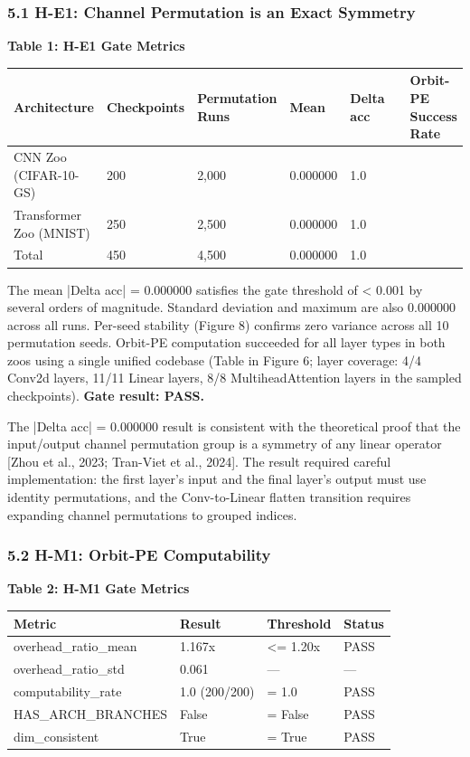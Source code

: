
\subsubsection{5.1 H-E1: Channel Permutation is an Exact Symmetry}

\textbf{Table 1: H-E1 Gate Metrics}

\begin{table}[htbp]
\centering
\begin{tabular}{lllllll}
\toprule
Architecture & Checkpoints & Permutation Runs & Mean & Delta acc &  & Orbit-PE Success Rate \\
\midrule
CNN Zoo (CIFAR-10-GS) & 200 & 2,000 & 0.000000 & 1.0 &  &  \\
Transformer Zoo (MNIST) & 250 & 2,500 & 0.000000 & 1.0 &  &  \\
Total & 450 & 4,500 & 0.000000 & 1.0 &  &  \\
\bottomrule
\end{tabular}
\end{table}

The mean |Delta acc| = 0.000000 satisfies the gate threshold of < 0.001 by several orders of magnitude. Standard deviation and maximum are also 0.000000 across all runs. Per-seed stability (Figure 8) confirms zero variance across all 10 permutation seeds. Orbit-PE computation succeeded for all layer types in both zoos using a single unified codebase (Table in Figure 6; layer coverage: 4/4 Conv2d layers, 11/11 Linear layers, 8/8 MultiheadAttention layers in the sampled checkpoints). \textbf{Gate result: PASS.}

The |Delta acc| = 0.000000 result is consistent with the theoretical proof that the input/output channel permutation group is a symmetry of any linear operator [Zhou et al., 2023; Tran-Viet et al., 2024]. The result required careful implementation: the first layer's input and the final layer's output must use identity permutations, and the Conv-to-Linear flatten transition requires expanding channel permutations to grouped indices.

\subsubsection{5.2 H-M1: Orbit-PE Computability}

\textbf{Table 2: H-M1 Gate Metrics}

\begin{table}[htbp]
\centering
\begin{tabular}{llll}
\toprule
Metric & Result & Threshold & Status \\
\midrule
overhead_ratio_mean & 1.167x & <= 1.20x & PASS \\
overhead_ratio_std & 0.061 & — & — \\
computability_rate & 1.0 (200/200) & = 1.0 & PASS \\
HAS_ARCH_BRANCHES & False & = False & PASS \\
dim_consistent & True & = True & PASS \\
\bottomrule
\end{tabular}
\end{table}

